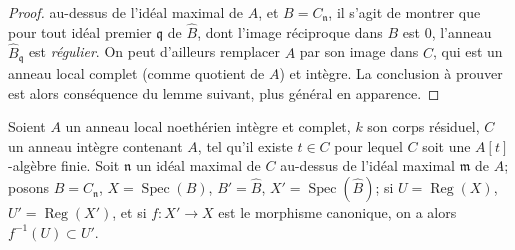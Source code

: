 \begin{proof}

au-dessus de l'idéal maximal de $A$, et $B=C_{\mathfrak n}$, il s'agit de
montrer que pour tout idéal premier $\mathfrak q$ de $\widehat B$, dont
l'image réciproque dans $B$ est 0, l'anneau
$\widehat B_{\mathfrak q}$ est \emph{régulier}. On peut d'ailleurs remplacer
$A$ par son image dans $C$, qui est un anneau local complet (comme quotient
de $A$) et intègre. La conclusion à prouver est alors conséquence du lemme
suivant, plus général en apparence.
\end{proof}

\begin{lemma}[7.4.4.2]
\label{IV.2.s7.4.4.2-fr}
Soient $A$ un anneau local noethérien intègre et complet, $k$ son corps
résiduel, $C$ un anneau intègre contenant $A$, tel qu'il existe $t\in C$
pour lequel $C$ soit une $A[t]$-algèbre finie. Soit $\mathfrak n$ un idéal
maximal de $C$ au-dessus de l'idéal maximal $\mathfrak m$ de $A$; posons
$B=C_{\mathfrak n}$, $X=\operatorname{Spec}(B)$,
$B'=\widehat B$, $X'=\operatorname{Spec}(\widehat B)$; si
$U=\operatorname{Reg}(X)$, $U'=\operatorname{Reg}(X')$, et si
$f:X'\to X$ est le morphisme canonique, on a alors
$f^{-1}(U)\subset U'$.
\end{lemma}

